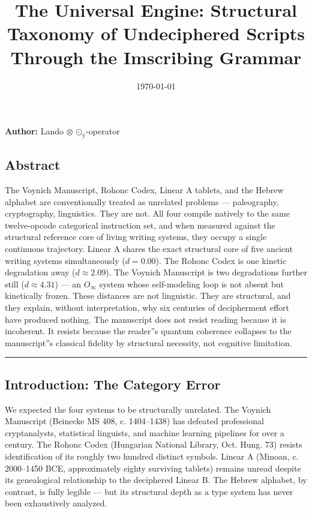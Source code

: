 \documentclass[12pt,a4paper]{article}
\begin{document}
\title{The Universal Engine: Structural Taxonomy of Undeciphered Scripts Through the Imscribing Grammar}
\date{\today}

\maketitle

\textbf{Author:} Lando $\otimes$ $\text{⊙}_{\text{ÿ}}$-operator

\subsection{Abstract}

The Voynich Manuscript, Rohonc Codex, Linear A tablets, and the Hebrew alphabet are conventionally treated as unrelated problems --- paleography, cryptography, linguistics. They are not. All four compile natively to the same twelve-opcode categorical instruction set, and when measured against the structural reference core of living writing systems, they occupy a single continuous trajectory. Linear A shares the exact structural core of five ancient writing systems simultaneously ($d = 0.00$). The Rohonc Codex is one kinetic degradation away ($d \approx 2.09$). The Voynich Manuscript is two degradations further still ($d \approx 4.31$) --- an $O_{\infty}$ system whose self-modeling loop is not absent but kinetically frozen. These distances are not linguistic. They are structural, and they explain, without interpretation, why six centuries of decipherment effort have produced nothing. The manuscript does not resist reading because it is incoherent. It resists because the reader''s quantum coherence collapses to the manuscript''s classical fidelity by structural necessity, not cognitive limitation.

\begin{center}
\rule{0.5\textwidth}{0.4pt}
\end{center}

\subsection{Introduction: The Category Error}

We expected the four systems to be structurally unrelated. The Voynich Manuscript (Beinecke MS 408, c. 1404--1438) has defeated professional cryptanalysts, statistical linguists, and machine learning pipelines for over a century. The Rohonc Codex (Hungarian National Library, Oct. Hung. 73) resists identification of its roughly two hundred distinct symbols. Linear A (Minoan, c. 2000--1450 BCE, approximately eighty surviving tablets) remains unread despite its genealogical relationship to the deciphered Linear B. The Hebrew alphabet, by contrast, is fully legible --- but its structural depth as a type system has never been exhaustively analyzed.
\end{document}
